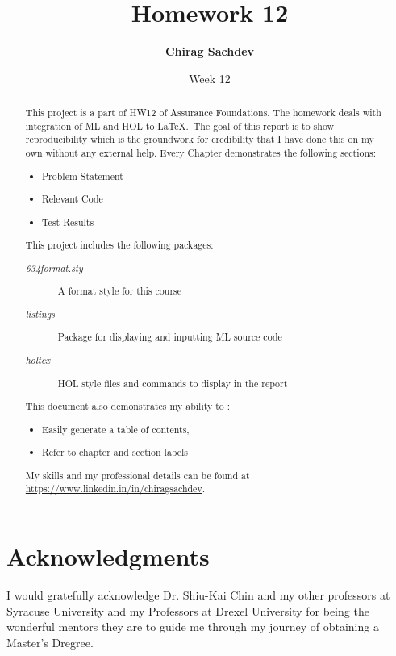 \documentclass{report}
\title{Homework 12}
\author{\textbf{Chirag Sachdev}}
\date{Week 12}
\begin{document}
\lstset{language=ML, breaklines=true, basicstyle=\small}
\maketitle{}

\begin{abstract}
This project is a part of HW12 of Assurance Foundations. The homework deals with integration of ML and HOL to \LaTeX.\ The goal of this report is to show reproducibility which is the groundwork for credibility that I have done this on my own without any external help. Every Chapter demonstrates the following sections:
	\begin{itemize}
		\item Problem Statement
		\item Relevant Code
		\item Test Results
	\end{itemize}
	
This project includes the following packages:
	\begin{description}
		\item[\emph{634format.sty}] A format style for this course
		\item[\emph{listings}] Package for displaying and inputting ML source code
		\item[\emph{holtex}] HOL style files and commands to display in the report
	\end{description}

This document also demonstrates my ability to :
	\begin{itemize}
		\item Easily generate a table of contents,
		\item Refer to chapter and section labels
	\end{itemize}

My skills and my professional details can be found at \url{https://www.linkedin.in/in/chiragsachdev}.
\end{abstract}

\section*{Acknowledgments}
I would gratefully acknowledge Dr. Shiu-Kai Chin and my other professors at Syracuse University and my Professors at Drexel University for being the wonderful mentors they are to guide me through my journey of obtaining a Master's Dregree.

\tableofcontents{}
\end{document}
